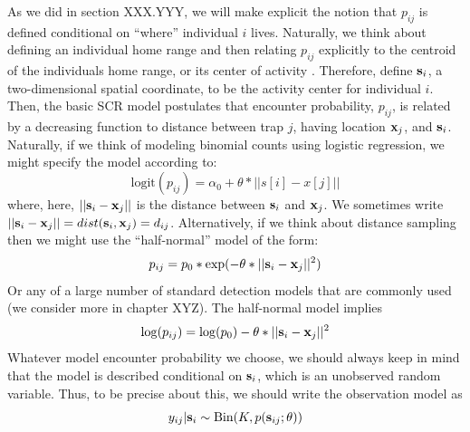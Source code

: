 As we did in section XXX.YYY, we will make explicit the notion that
$p_{ij}$ is defined conditional on ``where'' individual $i$
lives. Naturally, we think about defining an individual home range and
then relating $p_{ij}$ explicitly to the centroid of the individuals
home range, or its center of activity \citep{efford:2004, borchers_efford:2008, royle_young:2008}.  
Therefore, define ${\bf s}_{i}$, a two-dimensional spatial coordinate,
to be the activity center for individual $i$. Then, the basic SCR
model postulates that encounter probability, $p_{ij}$, is related by a
decreasing function to distance between trap $j$, having location
${\bf x}_{j}$, and ${\bf s}_{i}$.  Naturally, if we think of modeling binomial counts using logistic regression, we might specify the model according to:
\begin{equation}
	\mbox{logit}(p_{ij}) = \alpha_{0} + \theta *||s[i]-x[j]||				
\label{scr0.eq.logit}
\end{equation}
where, here, $||{\bf s}_{i}-{\bf x}_{j}||$ is the distance between
${\bf s}_{i}$ and ${\bf x}_{j}$. We sometimes write $||{\bf
  s}_{i}-{\bf x}_{j}|| = dist({\bf s}_{i},{\bf x}_{j}) =
d_{ij}$. Alternatively, if we think about distance sampling then we
might use the ``half-normal'' model of the form:
\[
p_{ij} = p_{0}*\exp(-\theta*||{\bf s}_{i}-{\bf x}_{j}||^2)
\]
Or any of a large number of standard detection models that are
commonly used (we consider more in chapter XYZ). The half-normal model implies 
\begin{equation}
\log(p_{ij})  = \log(p_{0}) - \theta*||{\bf s}_{i}-{\bf x}_{j}||^2
\label{scr0.eq.norm}
\end{equation}
Whatever model encounter probability we choose, we should always keep
in mind that the model is described conditional on ${\bf s}_{i}$, which is an
unobserved random variable.  Thus, to be precise about this, we should
write the observation model as
\[
y_{ij}|{\bf s}_{i} \sim \mbox{Bin}(K, p({\bf s}_{ij};\theta))
\]


